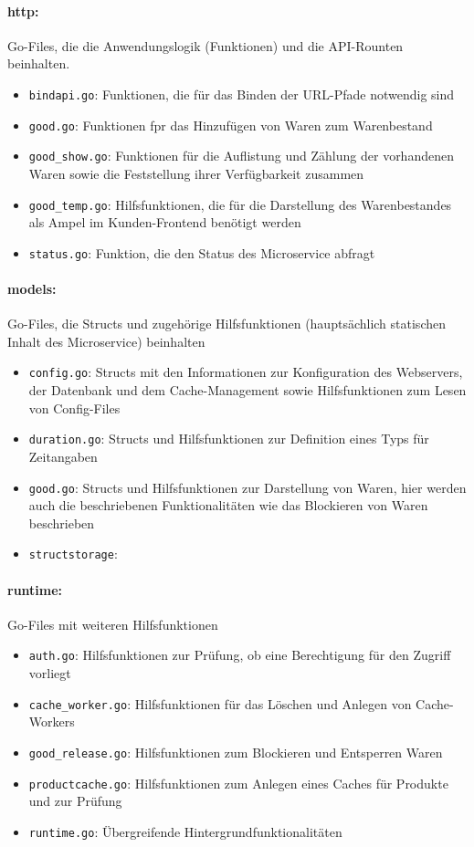 \paragraph{http:} Go-Files, die die Anwendungslogik (Funktionen) und die API-Rounten beinhalten.
	\begin{itemize}
	\item \texttt{bindapi.go}: Funktionen, die für das Binden der URL-Pfade notwendig sind
	\item \texttt{good.go}: Funktionen fpr das Hinzufügen von Waren zum Warenbestand
	\item \texttt{good\_show.go}: Funktionen für die Auflistung und Zählung der vorhandenen Waren sowie die Feststellung ihrer Verfügbarkeit zusammen
	\item \texttt{good\_temp.go}: Hilfsfunktionen, die für die Darstellung des Warenbestandes als Ampel im Kunden-Frontend benötigt werden
	\item \texttt{status.go}: Funktion, die den Status des Microservice abfragt 
	\end{itemize}


\paragraph{models:} Go-Files, die Structs und zugehörige Hilfsfunktionen (hauptsächlich statischen Inhalt des Microservice) beinhalten 
	\begin{itemize}
	\item \texttt{config.go}: Structs mit den Informationen zur Konfiguration des Webservers, der Datenbank und dem Cache-Management sowie Hilfsfunktionen zum Lesen von Config-Files
	\item \texttt{duration.go}: Structs und Hilfsfunktionen zur Definition eines Typs für Zeitangaben
	\item \texttt{good.go}: Structs und Hilfsfunktionen zur Darstellung von Waren, hier werden auch die beschriebenen Funktionalitäten wie das Blockieren von Waren beschrieben
	\item \texttt{structstorage}: 
	\end{itemize}


\paragraph{runtime:} Go-Files mit weiteren Hilfsfunktionen
	\begin{itemize}	
	\item \texttt{auth.go}: Hilfsfunktionen zur Prüfung, ob eine Berechtigung für den Zugriff vorliegt
	\item \texttt{cache\_worker.go}: Hilfsfunktionen für das Löschen und Anlegen von Cache-Workers
	\item \texttt{good\_release.go}: Hilfsfunktionen zum Blockieren und Entsperren Waren
	\item \texttt{productcache.go}: Hilfsfunktionen zum Anlegen eines Caches für Produkte und zur Prüfung
	\item \texttt{runtime.go}: Übergreifende Hintergrundfunktionalitäten	
	\end{itemize}
	


